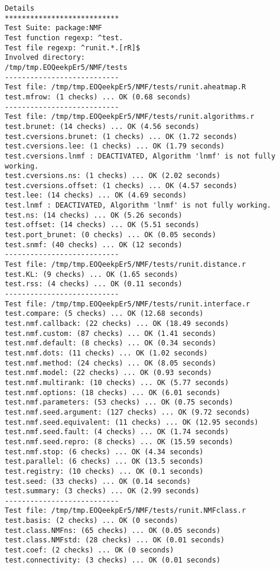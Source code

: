 \documentclass[10pt]{article}
\begin{document}
\begin{verbatim}
Details 
*************************** 
Test Suite: package:NMF 
Test function regexp: ^test. 
Test file regexp: ^runit.*.[rR]$ 
Involved directory: 
/tmp/tmp.EOQeekpEr5/NMF/tests 
--------------------------- 
Test file: /tmp/tmp.EOQeekpEr5/NMF/tests/runit.aheatmap.R 
test.mfrow: (1 checks) ... OK (0.68 seconds)
--------------------------- 
Test file: /tmp/tmp.EOQeekpEr5/NMF/tests/runit.algorithms.r 
test.brunet: (14 checks) ... OK (4.56 seconds)
test.cversions.brunet: (1 checks) ... OK (1.72 seconds)
test.cversions.lee: (1 checks) ... OK (1.79 seconds)
test.cversions.lnmf : DEACTIVATED, Algorithm 'lnmf' is not fully working.
test.cversions.ns: (1 checks) ... OK (2.02 seconds)
test.cversions.offset: (1 checks) ... OK (4.57 seconds)
test.lee: (14 checks) ... OK (4.69 seconds)
test.lnmf : DEACTIVATED, Algorithm 'lnmf' is not fully working.
test.ns: (14 checks) ... OK (5.26 seconds)
test.offset: (14 checks) ... OK (5.51 seconds)
test.port_brunet: (0 checks) ... OK (0.05 seconds)
test.snmf: (40 checks) ... OK (12 seconds)
--------------------------- 
Test file: /tmp/tmp.EOQeekpEr5/NMF/tests/runit.distance.r 
test.KL: (9 checks) ... OK (1.65 seconds)
test.rss: (4 checks) ... OK (0.11 seconds)
--------------------------- 
Test file: /tmp/tmp.EOQeekpEr5/NMF/tests/runit.interface.r 
test.compare: (5 checks) ... OK (12.68 seconds)
test.nmf.callback: (22 checks) ... OK (18.49 seconds)
test.nmf.custom: (87 checks) ... OK (1.41 seconds)
test.nmf.default: (8 checks) ... OK (0.34 seconds)
test.nmf.dots: (11 checks) ... OK (1.02 seconds)
test.nmf.method: (24 checks) ... OK (8.05 seconds)
test.nmf.model: (22 checks) ... OK (0.93 seconds)
test.nmf.multirank: (10 checks) ... OK (5.77 seconds)
test.nmf.options: (18 checks) ... OK (6.01 seconds)
test.nmf.parameters: (53 checks) ... OK (0.75 seconds)
test.nmf.seed.argument: (127 checks) ... OK (9.72 seconds)
test.nmf.seed.equivalent: (11 checks) ... OK (12.95 seconds)
test.nmf.seed.fault: (4 checks) ... OK (1.74 seconds)
test.nmf.seed.repro: (8 checks) ... OK (15.59 seconds)
test.nmf.stop: (6 checks) ... OK (4.34 seconds)
test.parallel: (6 checks) ... OK (13.5 seconds)
test.registry: (10 checks) ... OK (0.1 seconds)
test.seed: (33 checks) ... OK (0.14 seconds)
test.summary: (3 checks) ... OK (2.99 seconds)
--------------------------- 
Test file: /tmp/tmp.EOQeekpEr5/NMF/tests/runit.NMFclass.r 
test.basis: (2 checks) ... OK (0 seconds)
test.class.NMFns: (65 checks) ... OK (0.05 seconds)
test.class.NMFstd: (28 checks) ... OK (0.01 seconds)
test.coef: (2 checks) ... OK (0 seconds)
test.connectivity: (3 checks) ... OK (0.01 seconds)

\end{verbatim}
\end{document}
